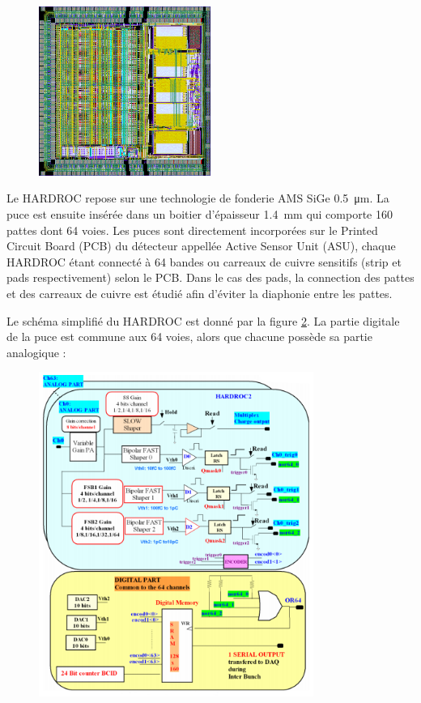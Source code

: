 \begin{figure}[ht!]
	\centering
	\includegraphics[width=0.5\textwidth]{GLA/HARDROC.png}
	\label{hardroc}
\end{figure}

Le HARDROC repose sur une technologie de fonderie AMS SiGe \SI{0.5}{\micro\meter}. La puce est ensuite insérée dans un boitier d'épaisseur \SI{1.4}{\milli\meter} qui comporte \num{160} pattes dont \num{64} voies. Les puces sont directement incorporées sur le Printed Circuit Board (PCB) du détecteur appellée Active Sensor Unit (ASU), chaque HARDROC étant connecté à \num{64} bandes ou carreaux de cuivre sensitifs (strip et pads respectivement) selon le PCB. Dans le cas des pads, la connection des pattes et des carreaux de cuivre est étudié afin d'éviter la diaphonie entre les pattes.

Le schéma simplifié du HARDROC est donné par la figure \ref{scheme}. La partie digitale de la puce est commune aux \num{64} voies, alors que chacune possède sa partie analogique :

\begin{figure}[ht!]
	\centering
	\includegraphics[width=0.8\textwidth]{GLA/scheme.png}
	\label{scheme}
\end{figure}

